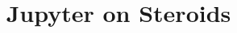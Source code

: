 \documentclass{sig-alternate}
\begin{document}
\newcommand{\projname}[0]{ViDeTTe}
\newcommand{\angular}[0]{AngularJS}
\newcommand{\react}[0]{React}

\title{Jupyter on Steroids}

\maketitle

 

\begin{sloppypar}


%


%











\end{sloppypar}



\end{document}
